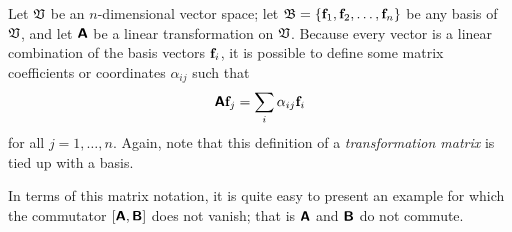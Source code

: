 Let ${\frak V}$ be an $n$-dimensional vector space;
let
${\frak B}=\{{\bf f}_1,{\bf f}_2,\ldots ,{\bf f}_n\}$ be any basis of ${\frak V}$,
and let  $\textsf{\textbf{A}}$ be a linear transformation on ${\frak V}$.
Because every vector is a linear combination of the basis vectors
${\bf f}_i$,
it is possible to define some matrix coefficients or coordinates
$\alpha_{ij}$ such that
\begin{equation}
\textsf{\textbf{A}} {\bf f}_j = \sum_i \alpha_{ij}{\bf f}_i
\end{equation}
for all $j=1,\ldots ,n$.
Again, note that this definition of a {\em transformation matrix}
is tied up with a basis.

{\color{blue}
\bexample
In terms of this matrix notation, it is quite easy to present an example
for which the commutator
$
[\textsf{\textbf{A}}, \textsf{\textbf{B}} ]
$
does not vanish; that is
$\textsf{\textbf{A}}$  and $\textsf{\textbf{B}}$
do not commute.

}
